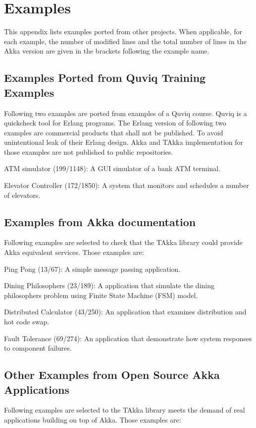 \section{Examples}
This appendix lists examples ported from other projects.  When applicable, for each example, the number of modified lines and the total number of lines in the Akka version are given in the brackets following the example name. 


\subsection{Examples Ported from Quviq Training Examples}
Following two examples are ported from examples of a Quviq course.  Quviq is a quickcheck tool for Erlang programs.  The Erlang version of following two examples are commercial products that shall not be published.  To avoid unintentional leak of their Erlang design. Akka and TAkka implementation for those examples are not published to public repositories.

ATM simulator (199/1148): A GUI simulator of a bank ATM terminal.

Elevator Controller (172/1850): A system that monitors and schedules a number of elevators.


\subsection{Examples from Akka documentation}
Following examples are selected to check that the TAkka library could provide Akka equivalent services.  Those examples are:

Ping Pong (13/67): A simple message passing application.

Dining Philosophers (23/189): A application that simulate the dining philosophers problem using Finite State Machine (FSM) model.

Distributed Calculator (43/250): An application that examines distribution and hot code swap.

Fault Tolerance (69/274): An application that demonstrate how system responses to component failures.

\subsection{Other Examples from Open Source Akka Applications}
Following examples are selected to the TAkka library meets the demand of real applications building on top of Akka.  Those examples are:

